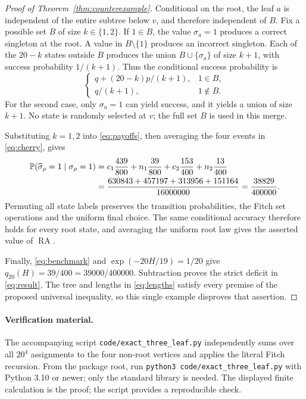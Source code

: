 \documentclass[11pt]{article}
\newcommand{\RA}{\operatorname{RA}}
\newcommand{\Prob}{\mathbb P}
\begin{document}
\begin{proof}[Proof of Theorem~\ref{thm:counterexample}]
Conditional on the root, the leaf $a$ is independent of the entire subtree
below $v$, and therefore independent of $B$. Fix a possible set $B$ of size
$k\in\{1,2\}$. If $1\in B$, the value $\sigma_a=1$ produces a correct singleton
at the root. A value in $B\setminus\{1\}$ produces an incorrect singleton.
Each of the $20-k$ states outside $B$ produces the union $B\cup\{\sigma_a\}$
of size $k+1$, with success probability $1/(k+1)$. Thus the conditional
success probability is
\begin{equation}\label{eq:payoffs}
 \begin{cases}
 q+(20-k)p/(k+1),&1\in B,\\
 q/(k+1),&1\notin B.
 \end{cases}
\end{equation}
For the second case, only $\sigma_a=1$ can yield success, and it yields a
union of size $k+1$. No state is randomly selected at $v$; the full set $B$
is used in this merge.

Substituting $k=1,2$ into \eqref{eq:payoffs}, then averaging the four events
in \eqref{eq:cherry}, gives
\begin{align}
 \Prob(\widehat\sigma_\rho=1\mid\sigma_\rho=1)
 &=c_1\frac{439}{800}+n_1\frac{39}{800}
   +c_2\frac{153}{400}+n_2\frac{13}{400}\notag\\
 &=\frac{630843+457197+313956+151164}{16000000}
  =\frac{38829}{400000}.\label{eq:accuracy}
\end{align}
Permuting all state labels preserves the transition probabilities, the Fitch
set operations and the uniform final choice. The same conditional accuracy
therefore holds for every root state, and averaging the uniform root law
gives the asserted value of $\RA$.

Finally, \eqref{eq:benchmark} and $\exp(-20H/19)=1/20$ give
$q_{20}(H)=39/400=39000/400000$. Subtraction proves the strict deficit in
\eqref{eq:result}. The tree and lengths in \eqref{eq:lengths} satisfy every
premise of the proposed universal inequality, so this single example disproves
that assertion.
\end{proof}

\paragraph{Verification material.}
The accompanying script \texttt{code/exact\_three\_leaf.py} independently
sums over all $20^4$ assignments to the four non-root vertices and applies the
literal Fitch recursion. From the package root, run
\texttt{python3 code/exact\_three\_leaf.py} with Python 3.10 or newer; only
the standard library is needed. The displayed finite calculation is the proof;
the script provides a reproducible check.
\end{document}
